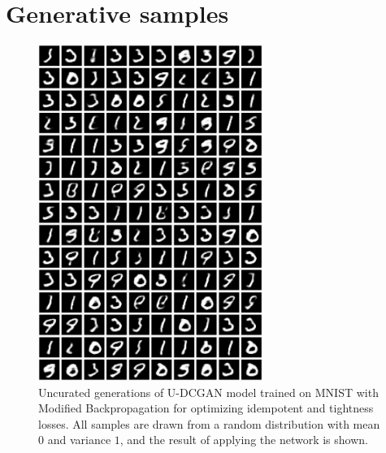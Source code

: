 \documentclass{article}
\theoremstyle{plain}
\theoremstyle{definition}
\theoremstyle{remark}
\begin{document}
\section{Generative samples}
\label{app:gen-samples}
\begin{figure}[H]
    \centering
    \includegraphics[width=0.65\textwidth]{./resources/modified_0-1_0-1_rand_samples.png}
    \caption{Uncurated generations of U-DCGAN model trained on MNIST with Modified Backpropagation for optimizing idempotent and tightness losses. All samples are drawn from a random distribution with mean $0$ and variance $1$, and the result of applying the network is shown.}
    \label{fig:big-gen-mnist}
\end{figure}

\newpage
\end{document}
